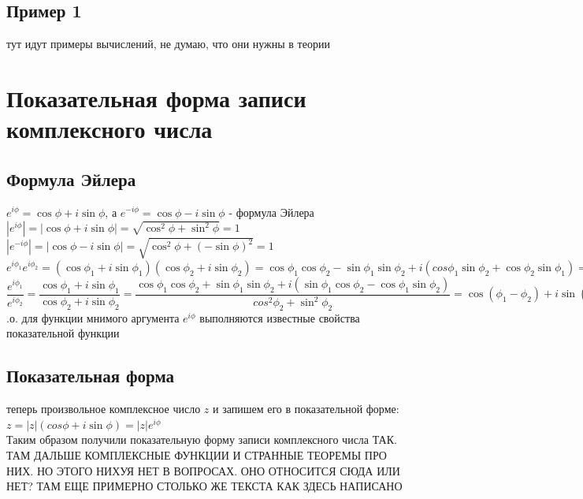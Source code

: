 \documentclass[oneside]{book}
\begin{document}
\begin{itemize}
\begin{enumerate}
\subsection{Пример 1}
тут идут примеры вычислений, не думаю, что они нужны в теории
\section{Показательная форма записи комплексного числа}
\subsection{Формула Эйлера}
 $e^{i\phi}=\cos\phi+i\sin\phi$, а $e^{-i\phi}=\cos\phi-i\sin\phi$ - формула Эйлера\\
$|e^{i\phi}|=|\cos\phi+i\sin\phi|=\sqrt{\cos^2\phi+\sin^2\phi}=1$\\
$|e^{-i\phi}|=|\cos\phi-i\sin\phi|=\sqrt{\cos^2\phi+(-\sin\phi)^2}=1$\\
$e^{i\phi_1}e^{i\phi_2}=(\cos\phi_1+i\sin\phi_1)(\cos\phi_2+i\sin\phi_2)=\cos\phi_1\cos\phi_2-\sin\phi_1\sin\phi_2+i(cos\phi_1\sin\phi_2+\cos\phi_2\sin\phi_1)=\cos(\phi_1+\phi_2)+i\sin(\phi_1+\phi_2)=e^{i(\phi_1+\phi_2)}$\\
$\dfrac{e^{i\phi_1}}{e^{i\phi_2}}=\dfrac{\cos\phi_1+i\sin\phi_1}{\cos\phi_2+i\sin\phi_2}=\dfrac{\cos\phi_1\cos\phi_2 + \sin\phi_1\sin\phi_2+i(\sin\phi_1\cos\phi_2-\cos\phi_1\sin\phi_2)}{cos^2\phi_2+\sin^2\phi_2}=\cos(\phi_1-\phi_2)+i\sin(\phi_1-\phi_2)=e^{i(\phi_1-\phi_2)}$
.о. для функции мнимого аргумента $e^{i\phi}$ выполняются известные свойства показательной функции
\subsection{Показательная форма}
 теперь произвольное комплексное число $z$ и запишем его в показательной форме:\\
$z=|z|(cos\phi+i\sin\phi)=|z|e^{i\phi}$\\
Таким образом получили показательную форму записи комплексного числа
ТАК. ТАМ ДАЛЬШЕ КОМПЛЕКСНЫЕ ФУНКЦИИ И СТРАННЫЕ ТЕОРЕМЫ ПРО НИХ. НО ЭТОГО НИХУЯ НЕТ В ВОПРОСАХ. ОНО ОТНОСИТСЯ СЮДА ИЛИ НЕТ? ТАМ ЕЩЕ ПРИМЕРНО СТОЛЬКО ЖЕ ТЕКСТА КАК ЗДЕСЬ НАПИСАНО
\setcounter{chapter}{30}

\end{enumerate}
\end{itemize}
\end{document}
